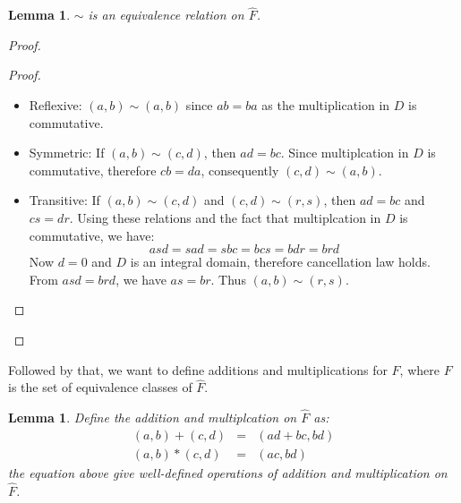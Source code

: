\documentclass{article}
\theoremstyle{MyNonumberplain}
\theoremstyle{break}
\newtheorem*{proof}{Proof. }
\theoremstyle{break}
\newtheorem{lemma}[theorem]{Lemma}
\theoremstyle{break}
\theoremstyle{definition}
\theoremstyle{break}
\begin{document}
\begin{thmbox}
    \begin{lemma}
        $\sim$ is an equivalence relation on $\hat{F}$.
    \end{lemma}
    \begin{prfbox}
        \begin{proof}
            \begin{proof}
                \begin{itemize}
                    \item Reflexive: $(a, b) \sim (a, b)$ since $ab = ba$ as the
                    multiplication in $D$ is commutative.\\
                    
                    \item Symmetric: If $(a, b) \sim (c, d)$, then $ad = bc$.
                    Since multiplcation in $D$ is commutative, therefore $cb =
                    da$, consequently $(c, d) \sim (a, b)$.\\
                    
                    \item Transitive: If $(a, b) \sim (c, d)$ and $(c, d) \sim (r, s)$, then
                    $ad = bc$ and $cs = dr$. Using these relations
                    and the fact that multiplcation in $D$ is commutative, we have:
                    \[ asd = sad = sbc = bcs = bdr =
                       brd \]
                    Now $d = 0$ and $D$ is an integral domain, therefore cancellation law holds.
                    From $asd = brd$, we have $as = br$. Thus $(a,
                    b) \sim (r, s)$.
                  \end{itemize}
            \end{proof}
            
        \end{proof}
    \end{prfbox}
\end{thmbox}

Followed by that, we want to define additions and multiplications for $F$, where $F$ is the set of equivalence classes of $\hat{F}$.
\begin{thmbox}
    \begin{lemma}
            Define the addition and multiplcation on $\hat{F}$ as:
            \begin{eqnarray*}
                (a,b)+(c,d) & = & (ad+bc,bd)\\
                (a,b)*(c,d) & = & (ac,bd)
            \end{eqnarray*}
            the equation above give well-defined operations of addition and multiplication on $\hat{F}$.
    \end{lemma}
\end{thmbox}
\end{document}
